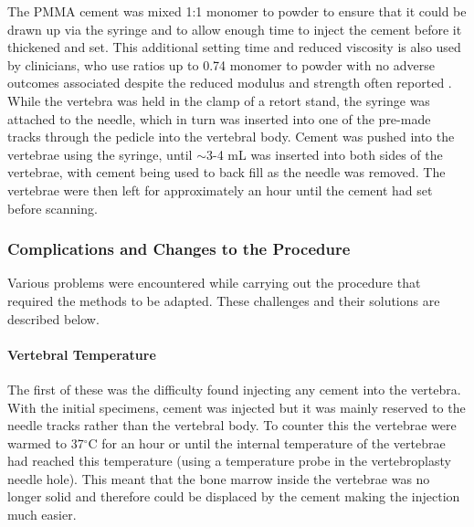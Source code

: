The PMMA cement was mixed 1:1 monomer to powder to ensure that it could be drawn up via the syringe and to allow enough time to inject the cement before it thickened and set. This additional setting time and reduced viscosity is also used by clinicians, who use ratios up to 0.74 monomer to powder with no adverse outcomes associated despite the reduced modulus and strength often reported \cite{Belkoff2002,Jasper1999}.
While the vertebra was held in the clamp of a retort stand, the syringe was attached to the needle, which in turn was inserted into one of the pre-made tracks through the pedicle into the vertebral body.
Cement was pushed into the vertebrae using the syringe, until $\sim$3-4 mL was inserted into both sides of the vertebrae, with cement being used to back fill as the needle was removed. The vertebrae were then left for approximately an hour until the cement had set before scanning.



\subsubsection{Complications and Changes to the Procedure}\label{complications}

Various problems were encountered while carrying out the procedure that required the methods to be adapted. These challenges and their solutions are described below.

\paragraph{Vertebral Temperature}
The first of these was the difficulty found injecting any cement into the vertebra. With the initial specimens, cement was injected but it was mainly reserved to the needle tracks rather than the vertebral body. To counter this the vertebrae were warmed to 37$^\circ$C for an hour or until the internal temperature of the vertebrae had reached this temperature (using a temperature probe in the vertebroplasty needle hole). This meant that the bone marrow inside the vertebrae was no longer solid and therefore could be displaced by the cement making the injection much easier.

